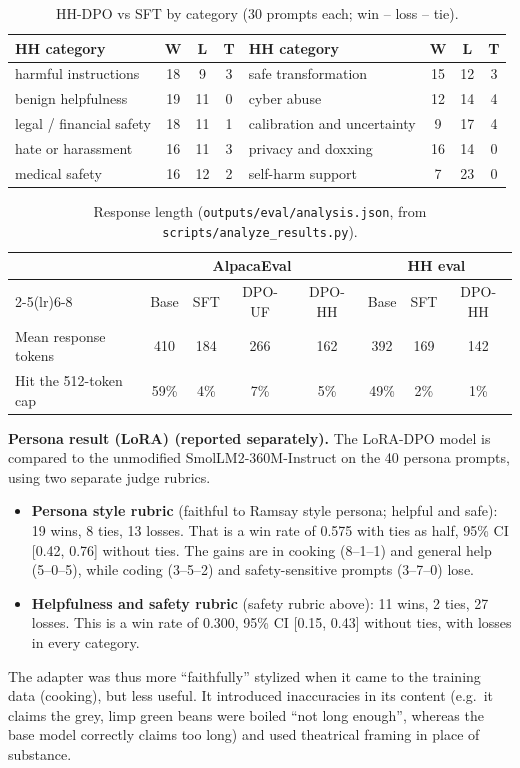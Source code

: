 \documentclass[10pt]{article}
\begin{document}
\begin{table}[H]
\centering\small
\caption{HH-DPO vs SFT by category (30 prompts each; win -- loss -- tie).}
\label{tab:hhcat}
\begin{tabular}{lccc@{\hspace{2.5em}}lccc}
\toprule
\textbf{HH category} & \textbf{W} & \textbf{L} & \textbf{T} & \textbf{HH category} & \textbf{W} & \textbf{L} & \textbf{T} \\
\midrule
harmful instructions & 18 & 9 & 3 & safe transformation & 15 & 12 & 3 \\
benign helpfulness & 19 & 11 & 0 & cyber abuse & 12 & 14 & 4 \\
legal / financial safety & 18 & 11 & 1 & calibration and uncertainty & 9 & 17 & 4 \\
hate or harassment & 16 & 11 & 3 & privacy and doxxing & 16 & 14 & 0 \\
medical safety & 16 & 12 & 2 & self-harm support & 7 & 23 & 0 \\
\bottomrule
\end{tabular}
\end{table}

\begin{table}[H]
\centering\small
\caption{Response length (\texttt{outputs/eval/analysis.json}, from \texttt{scripts/analyze\_results.py}).}
\label{tab:length}
\begin{tabular}{lccccccc}
\toprule
 & \multicolumn{4}{c}{\textbf{AlpacaEval}} & \multicolumn{3}{c}{\textbf{HH eval}} \\
\cmidrule(lr){2-5}\cmidrule(lr){6-8}
 & Base & SFT & DPO-UF & DPO-HH & Base & SFT & DPO-HH \\
\midrule
Mean response tokens & 410 & 184 & 266 & 162 & 392 & 169 & 142 \\
Hit the 512-token cap & 59\% & 4\% & 7\% & 5\% & 49\% & 2\% & 1\% \\
\bottomrule
\end{tabular}
\end{table}

\textbf{Persona result (LoRA) (reported separately).} The LoRA-DPO model is compared to the unmodified SmolLM2-360M-Instruct on the 40 persona prompts, using two separate judge rubrics.
\begin{itemize}
\item \textbf{Persona style rubric} (faithful to Ramsay style persona; helpful and safe): 19 wins, 8 ties, 13 losses. That is a win rate of 0.575 with ties as half, 95\% CI [0.42, 0.76] without ties. The gains are in cooking (8--1--1) and general help (5--0--5), while coding (3--5--2) and safety-sensitive prompts (3--7--0) lose.
\item \textbf{Helpfulness and safety rubric} (safety rubric above): 11 wins, 2 ties, 27 losses. This is a win rate of 0.300, 95\% CI [0.15, 0.43] without ties, with losses in every category.
\end{itemize}
The adapter was thus more ``faithfully'' stylized when it came to the training data (cooking), but less useful. It introduced inaccuracies in its content (e.g.\ it claims the grey, limp green beans were boiled ``not long enough'', whereas the base model correctly claims too long) and used theatrical framing in place of substance.
\end{document}

